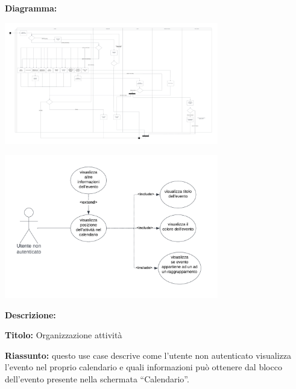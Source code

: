 \begin{listaPersonale}[UC]{}
    \textbf{Diagramma:}
    \begin{center}
        \includegraphics[width=0.7\textwidth]{img/Diagrammi/DS/DS_CreazioneModificaEvento.png}
    \end{center}




    \newpage


    \begin{center}
        \includegraphics[width=0.7\textwidth]{img/Diagrammi/UseCases/InserimentoAutomaticoCalendario.png}
    \end{center}

    \textbf{Descrizione:}

    \textbf{Titolo:} Organizzazione attività

    \textbf{Riassunto:} questo use case descrive come l'utente non autenticato visualizza l'evento nel proprio calendario e quali informazioni può ottenere dal blocco dell'evento presente nella schermata “Calendario”.


\end{listaPersonale}
